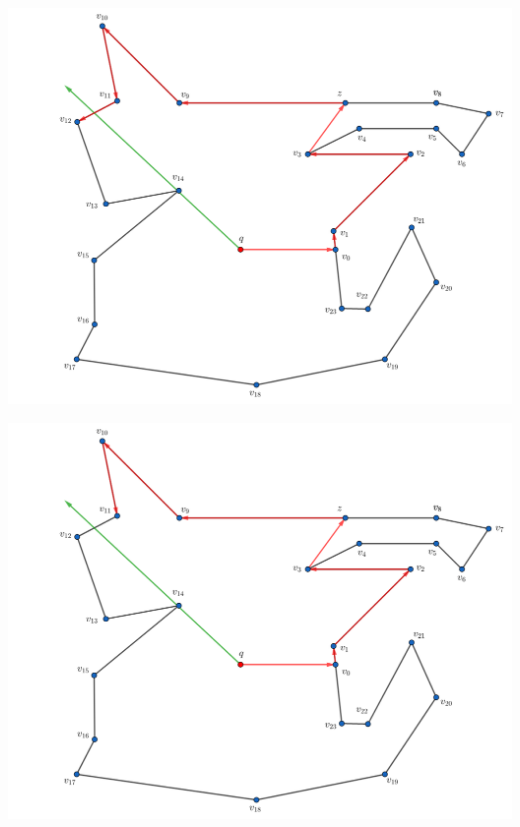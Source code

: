 \begin{frame}
  \centering \includegraphics[width=0.70 \paperwidth]{images/Ejecucion/e14.png}
\end{frame}

\begin{frame}
  \centering \includegraphics[width=0.70 \paperwidth]{images/Ejecucion/e15.png}
\end{frame}

